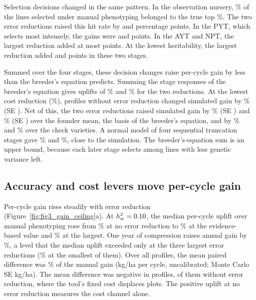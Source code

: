 Selection decisions changed in the same pattern. In the observation nursery, \NumChainHitONMan\% of the lines selected under manual phenotyping belonged to the true top \NumChainONSelPct\%. The two error reductions raised this hit rate by \NumChainHitGainONErrTen and \NumChainHitGainONErrFifty percentage points. In the PYT, which selects most intensely, the gains were \NumChainHitGainPYTErrTen and \NumChainHitGainPYTErrFifty points. In the AYT and NPT, the largest reduction added at most \NumChainHitGainAYTErrFifty points. At the lowest heritability, the largest reduction added \NumChainLowHitGainONErrFifty and \NumChainLowHitGainPYTErrFifty points in these two stages.

Summed over the four stages, these decision changes raise per-cycle gain by less than the breeder's equation predicts. Summing the stage responses of the breeder's equation gives uplifts of \NumChainBEUpliftErrTen\% and \NumChainBEUpliftErrFifty\% for the two reductions. At the lowest cost reduction (\NumChainSimCostRed\%), profiles without error reduction changed simulated gain by \NumChainSimUpliftErrZero\% (SE \NumChainSimSEErrZero). Net of this, the two error reductions raised simulated gain by \NumChainSimNetVsBaseErrTen\% (SE \NumChainSimNetVsBaseSEErrTen) and \NumChainSimNetVsBaseErrFifty\% (SE \NumChainSimNetVsBaseSEErrFifty) over the founder mean, the basis of the breeder's equation, and by \NumChainSimNetErrTen\% and \NumChainSimNetErrFifty\% over the check varieties. A normal model of four sequential truncation stages gave \NumChainSeqUpliftErrTen\% and \NumChainSeqUpliftErrFifty\%, close to the simulation. The breeder's-equation sum is an upper bound, because each later stage selects among lines with less genetic variance left.

\subsection{Accuracy and cost levers move per-cycle gain}\label{sec:res_gain}

Per-cycle gain rises steadily with error reduction (Figure~\ref{fig:fig3_gain_ceiling}a). At $h^2_w = 0.10$, the median per-cycle uplift over manual phenotyping rose from \NumUpliftErrZero\% at no error reduction to \NumUpliftErrTen\% at the evidence-based value and \NumUpliftErrFifty\% at the largest. One year of compression raises annual gain by \NumCycOneYearPct\%, a level that the median uplift exceeded only at the three largest error reductions (\NumUpliftErrThirty\% at the smallest of them). Over all \NumNcellsOK profiles, the mean paired difference was \NumDGdiffPct\% of the manual gain (\NumDGdiffPerCycle kg/ha per cycle, uncalibrated; Monte Carlo SE \NumDGdiffSE kg/ha). The mean difference was negative in \NumNcellsNegDiff profiles, \NumNcellsNegDiffErrZero of them without error reduction, where the tool's fixed cost displaces plots. The positive uplift at no error reduction measures the cost channel alone.

